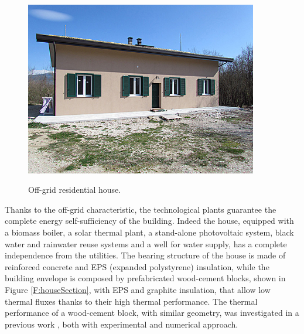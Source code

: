 \begin{figure}[t!]
	\begin{center}
		\includegraphics[width=24pc]{figures/Vista_sud.eps}
		\caption{Off-grid residential house.}
		\captionsetup{justification=centering}
		\label{F:house}
	\end{center}
\end{figure}
Thanks to the off-grid characteristic, the technological plants guarantee the complete energy self-sufficiency of the building. Indeed the house, equipped with a biomass boiler, a solar thermal plant, a stand-alone photovoltaic system, black water and rainwater reuse systems and a well for water supply, has a complete independence from the utilities.   
The bearing structure of the house is made of reinforced concrete and EPS (expanded polystyrene) insulation, while the building envelope is composed by prefabricated wood-cement blocks, shown in Figure \ref{F:houseSection}, with EPS and graphite insulation, that allow low thermal fluxes thanks to their high thermal performance. The thermal performance of a wood-cement block, with similar geometry, was investigated in a previous work \cite{Nardi2016}, both with experimental and numerical approach.
